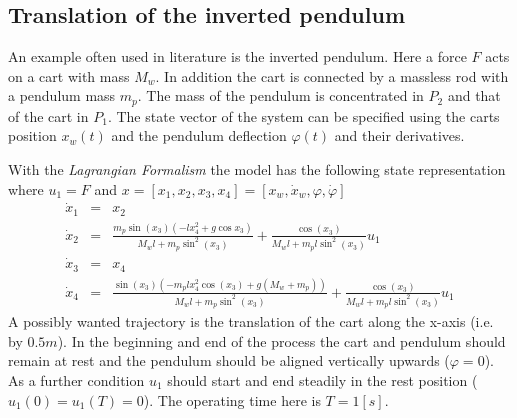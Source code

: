 \documentclass[letterpaper,10pt,english]{sphinxmanual}
\begin{document}
\subsection{Translation of the inverted pendulum}
\label{guide/examples/inv_pendulum_trans:ex-inv-pend}\label{guide/examples/inv_pendulum_trans::doc}\label{guide/examples/inv_pendulum_trans:translation-of-the-inverted-pendulum}
An example often used in literature is the inverted pendulum. Here a
force \(F\) acts on a cart with mass \(M_w\). In addition the
cart is connected by a massless rod with a pendulum mass \(m_p\).
The mass of the pendulum is concentrated in \(P_2\) and that of the
cart in \(P_1\). The state vector of the system can be specified
using the carts position \(x_w(t)\) and the pendulum deflection
\(\varphi(t)\) and their derivatives.


With the \emph{Lagrangian Formalism} the model has the following state
representation where \(u_1 = F\) and
\(x = [x_1, x_2, x_3, x_4] = [x_w, \dot{x}_w, \varphi, \dot{\varphi}]\)
\begin{eqnarray*}
   \dot{x}_1 & = & x_2 \\
   \dot{x}_2 & = & \frac{m_p \sin(x_3)(-l x_4^2 + g \cos x_3)}{M_w l + m_p \sin^2(x_3)} + \frac{\cos(x_3)}{M_w l + m_p l \sin^2(x_3)} u_1 \\
   \dot{x}_3 & = & x_4 \\
   \dot{x}_4 & = & \frac{\sin(x_3)(-m_p l x_4^2 \cos(x_3) + g(M_w + m_p))}{M_w l + m_p \sin^2(x_3)} + \frac{\cos(x_3)}{M_w l + m_p l \sin^2(x_3)} u_1
\end{eqnarray*}
A possibly wanted trajectory is the translation of the cart along the
x-axis (i.e. by \(0.5m\)). In the beginning and end of the process
the cart and pendulum should remain at rest and the pendulum should be
aligned vertically upwards (\(\varphi = 0\)). As a further condition
\(u_1\) should start and end steadily in the rest position
(\(u_1(0) = u_1(T) = 0\)).
The operating time here is \(T = 1 [s]\).
\end{document}
